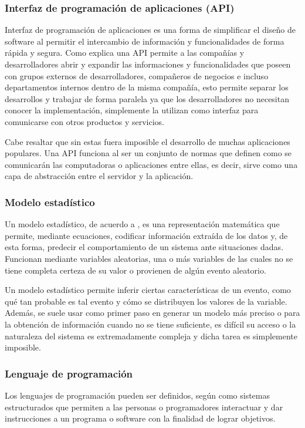 \subsubsection{Interfaz de programación de aplicaciones (API)}
Interfaz de programación de aplicaciones es una forma de simplificar el diseño
de software al permitir el intercambio de información y funcionalidades de forma
rápida y segura. Como explica \textcite{API} una API permite a las compañías y
desarrolladores abrir y expandir las informaciones y funcionalidades que poseen
con grupos externos de desarrolladores, compañeros de negocios e incluso departamentos
internos dentro de la misma compañía, esto permite separar los desarrollos y
trabajar de forma paralela ya que los desarrolladores no necesitan conocer la
implementación, simplemente la utilizan como interfaz para comunicarse con otros
productos y servicios.

Cabe resaltar que sin estas fuera imposible el desarrollo de muchas aplicaciones
populares. Una API funciona al ser un conjunto de normas que definen como se
comunicarán las computadoras o aplicaciones entre ellas, es decir, sirve como
una capa de abstracción entre el servidor y la aplicación.

\subsubsection{Modelo estadístico}

Un modelo estadístico, de acuerdo a \textcite{modeloIBM}, es una representación
matemática que permite, mediante
ecuaciones, codificar información extraída de los datos y, de esta forma,
predecir el comportamiento de un sistema ante situaciones dadas. Funcionan
mediante  variables aleatorias, una o más variables de las cuales no
se tiene completa certeza de su valor o provienen de algún evento aleatorio.

Un modelo estadístico permite inferir ciertas características de un evento,
como qué tan probable es tal evento y cómo se distribuyen los valores de la
variable. Además, se suele usar como primer paso en generar un modelo más
preciso o para la obtención de información cuando no se tiene suficiente,
es difícil su acceso o la naturaleza del
sistema es extremadamente compleja y dicha tarea es simplemente imposible.


\subsubsection{Lenguaje de programación}
Los lenguajes de programación pueden ser definidos, según \textcite{ETAC} como
sistemas estructurados
que permiten a las personas o programadores interactuar y dar instrucciones a un
programa o software con la finalidad de lograr objetivos.

